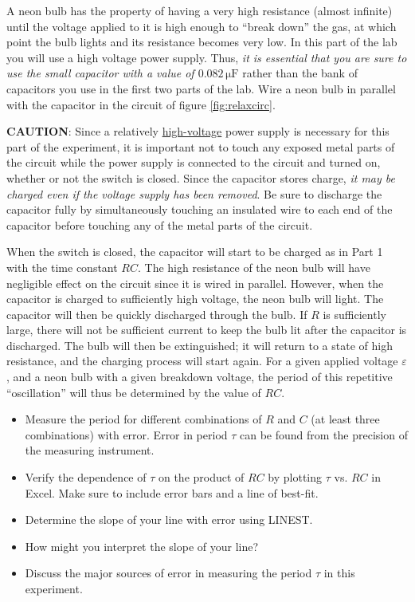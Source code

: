 A neon bulb has the property of having a very high resistance (almost infinite) until the voltage applied to it is high enough to ``break down'' the gas, at which point the bulb lights and its resistance becomes very low. In this part of the lab you will use a high voltage power supply. Thus, \emph{it is essential that you are sure to use the small capacitor with a value of $0.082\,\mathrm{\mu F}$} rather than the bank of capacitors you use in the first two parts of the lab. Wire a neon bulb in parallel with the capacitor in the circuit of figure \ref{fig:relaxcirc}.\myskip


\textbf{CAUTION}: Since a relatively \underline{high-voltage} power supply is necessary for this part of the experiment, it is important not to touch any exposed metal parts of the circuit while the power supply is connected to the circuit and turned on, whether or not the switch is closed. Since the capacitor stores charge, \emph{it may be charged even if the voltage supply has been removed}. Be sure to discharge the capacitor fully by simultaneously touching an insulated wire to each end of the capacitor before touching any of the metal parts of the circuit.\myskip

When the switch is closed, the capacitor will start to be charged as in Part 1 with the time constant $RC$. The high resistance  of the neon bulb will have negligible effect on the circuit since it is wired in parallel. However, when the capacitor is charged to sufficiently high voltage, the neon bulb will light. The capacitor will then be quickly discharged through the bulb. If $R$ is sufficiently large, there will not be sufficient current to keep the bulb lit after the capacitor is discharged. The bulb will then be extinguished; it will return to a state of high resistance, and the charging process will start again. For a given applied voltage $\varepsilon$, and a neon bulb with a given breakdown voltage, the period of this repetitive ``oscillation'' will thus be determined by the value of $RC$.\myskip
\begin{itemize}
  \item Measure the period for different combinations of $R$ and $C$ (at least three combinations) with error. Error in period $\tau$ can be found from the precision of the measuring instrument.
  \item Verify the dependence of $\tau$ on the product of $RC$ by plotting $\tau$ vs. $RC$ in Excel. Make sure to include error bars and a line of best-fit.
  \item Determine the slope of your line with error using LINEST.
  \item How might you interpret the slope of your line?
  \item Discuss the major sources of error in measuring the period $\tau$ in this experiment.
\end{itemize}
